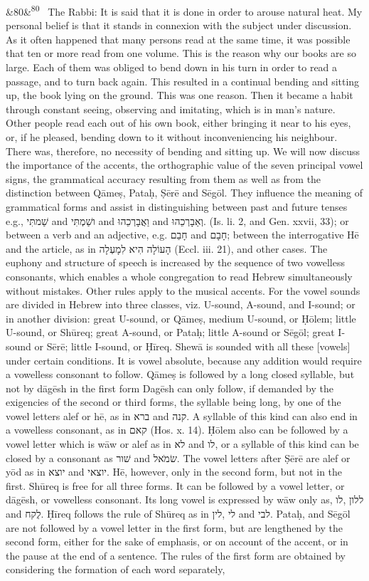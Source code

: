 \documentclass[12pt]{article}
\newcommand{\para}[1][]{\par\noindent\ifx&#1&\else\textsuperscript{\footnotesize #1}~\fi}
\begin{document}
\para[80] The Rabbi: It is said that it is done in order to arouse natural heat. My personal belief is that it stands in connexion with the subject under discussion. As it often happened that many persons read at the same time, it was possible that ten or more read from one volume. This is the reason why our books are so large. Each of them was obliged to bend down in his turn in order to read a passage, and to turn back again. This resulted in a continual bending and sitting up, the book lying on the ground. This was one reason. Then it became a habit through constant seeing, observing and imitating, which is in man's nature. Other people read each out of his own book, either bringing it near to his eyes, or, if he pleased, bending down to it without inconveniencing his neighbour. There was, therefore, no necessity of bending and sitting up. We will now discuss the importance of the accents, the orthographic value of the seven principal vowel signs, the grammatical accuracy resulting from them as well as from the distinction between Qāmeṣ, Pataḥ, Ṣērē and Sēgōl. They influence the meaning of grammatical forms and assist in distinguishing between past and future tenses e.g., ‏שַׁמתִּי‎ and ‏ושַׁמְתִּי‎ and ‏וַאֲבָרְכֵהוּ‎ and ‏וְאַבָרְכֵהוּ‎. (Is. li. 2, and Gen. xxvii, 33); or between a verb and an adjective, e.g. ‏חָבַם‎ and ‏חָבָם‎; between the interrogative Hē and the article, as in ‏הָעוֹלָה הִיא לִמָעְלָה ‎(Eccl. iii. 21), and other cases. The euphony and structure of speech is increased by the sequence of two vowelless consonants, which enables a whole congregation to read Hebrew simultaneously without mistakes. Other rules apply to the musical accents. For the vowel sounds are divided in Hebrew into three classes, viz. U-sound, A-sound, and I-sound; or in another division: great U-sound, or Qāmeṣ, medium U-sound, or Ḥōlem; little U-sound, or Shūreq; great A-sound, or Pataḥ; little A-sound or Sēgōl; great I-sound or Sērē; little I-sound, or Ḥīreq. Shewā is sounded with all these [vowels] under certain conditions. It is vowel absolute, because any addition would require a vowelless consonant to follow. Qāmeṣ is followed by a long closed syllable, but not by dāgēsh in the first form Dagēsh can only follow, if demanded by the exigencies of the second or third forms, the syllable being long, by one of the vowel letters alef or hē, as in ‏ברא‎ and ‏קנה‎. A syllable of this kind can also end in a vowelless consonant, as in ‏קאם‎ (Hos. x. 14). Ḥōlem also can be followed by a vowel letter which is wāw or alef as in ‏לא‎ and ‏לו‎, or a syllable of this kind can be closed by a consonant as ‏שׁור‎ and ‏שׂמׂאל‎. The vowel letters after Ṣērē are alef or yōd as in ‏יוצא‎ and ‏יוצאי‎. Hē, however, only in the second form, but not in the first. Shūreq is free for all three forms. It can be followed by a vowel letter, or dāgēsh, or vowelless consonant. Its long vowel is expressed by wāw only as, ‏לו‎, ‏ללון‎ and ‏לֻקח‎. Ḥīreq follows the rule of Shūreq as in ‏לין‎, ‏לי‎ and ‏לבי‎. Pataḥ, and Sēgōl are not followed by a vowel letter in the first form, but are lengthened by the second form, either for the sake of emphasis, or on account of the accent, or in the pause at the end of a sentence. The rules of the first form are obtained by considering the formation of each word separately, 
\end{document}
